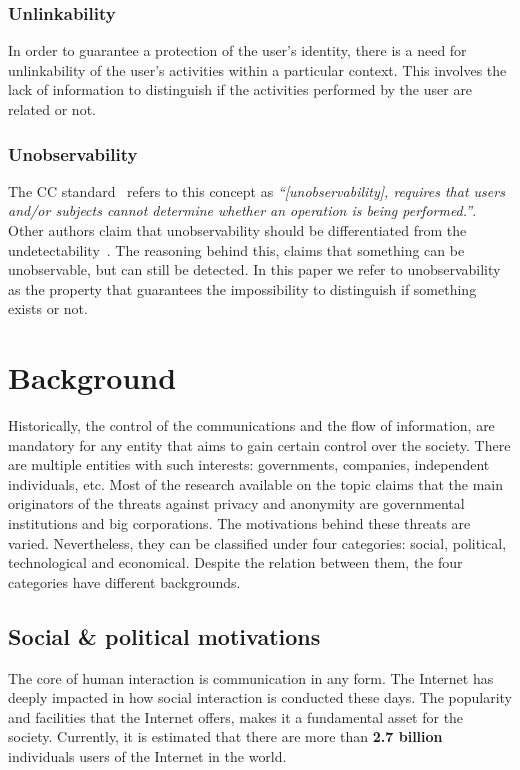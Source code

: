 \documentclass[conference]{IEEEtran}
\begin{document}
\subsubsection{Unlinkability}

In order to guarantee a protection of the user's identity, there is a
need for unlinkability of the user's activities within a particular
context. This involves the lack of information to distinguish if the
activities performed by the user are related or not.

\subsubsection{Unobservability}

The CC standard~\cite{iso15408} refers to this concept as
\textit{``[unobservability], requires that users and/or subjects cannot
    determine whether an operation is being performed.''}. Other
authors claim that unobservability should be differentiated from the
undetectability~\cite{anon_terminology}. The reasoning behind this, claims
that something can be unobservable, but can still be detected. In this paper
we refer to unobservability as the property that guarantees the
impossibility to distinguish if something exists or not.

\section{Background}

Historically, the control of the communications and the flow of
information, are mandatory for any entity that aims to gain
certain control over the society. There are multiple entities with such
interests: governments, companies, independent individuals, etc. Most
of the research available on the topic claims that the main originators of
the threats against privacy and anonymity are governmental institutions
and big corporations\cite{taxo}. The motivations behind these threats
are varied. Nevertheless, they can be classified under four
categories: social, political, technological and economical. Despite
the relation between them, the four categories have different backgrounds.

\subsection{Social \& political motivations}

The core of human interaction is communication in any
form. The Internet has deeply impacted in how social interaction
is conducted these days. The popularity and facilities that the Internet
offers, makes it a fundamental asset for the society. Currently, it is estimated that
there are more than \textbf{2.7 billion} individuals users of the Internet
in the world\cite{ICT}.
\end{document}
